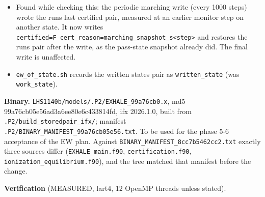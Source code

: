 \documentclass[english,a4paper]{my_memo}
\begin{document}
\begin{itemize}
  marching write assemble the residual from (u, f\_sp, heat, cool) and write
  those same arrays. The heat and cool are those of the last sweep, taken at
  its entry temperature (the documented one-sweep lag); on k02 the
  stored-pair evaluate, whose sources are the stored composition\textquotesingle s at the
  state\textquotesingle s own temperature, reads the energy row at 2.06661e-8 (cell 58)
  where the solve\textquotesingle s final certification read 2.067e-8 (cell 58).
\item
  Found while checking this: the periodic marching write (every 1000 steps)
  wrote the run\textquotesingle s last certified pair, measured at an earlier monitor step on
  another state. It now writes \texttt{certified=F\ cert\_reason=marching\_snapshot\_s\textless{}step\textgreater{}}
  and restores the run\textquotesingle s pair after the write, as the pass-state snapshot
  already did. The final write is unaffected.
\item
  \texttt{ew\_of\_state.sh} records the written state\textquotesingle s pair as \texttt{written\_state}
  (was \texttt{work\_state}).
\end{itemize}

\textbf{Binary.} \texttt{LHS1140b/models/.P2/EXHALE\_99a76cb0.x}, md5
99a76cb05e56ad3a6ee80e6c433814fd, ifx 2026.1.0, built from
\texttt{.P2/build\_storedpair\_ifx/}; manifest \texttt{.P2/BINARY\_MANIFEST\_99a76cb05e56.txt}.
To be used for the phase 5-6 acceptance of the EW plan.
Against \texttt{BINARY\_MANIFEST\_8cc7b5462cc2.txt} exactly three sources differ
(\texttt{EXHALE\_main.f90}, \texttt{certification.f90}, \texttt{ionization\_equilibrium.f90}), and
the tree matched that manifest before the change.

\textbf{Verification} (MEASURED, lart4, 12 OpenMP threads unless stated).
\end{document}
